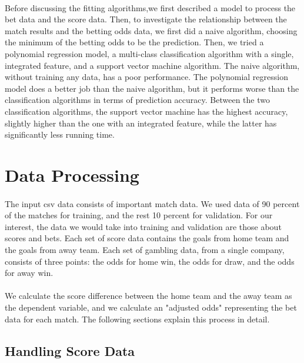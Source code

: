 \documentclass[12pt]{article}
\begin{document}
\paragraph{}
Before discussing the fitting algorithms,we first described a model to process the bet data and the score data. Then, to investigate the relationship between the match results and the betting odds data, we first did a naive algorithm, choosing the minimum of the betting odds to be the prediction. Then, we tried a polynomial regression model, a multi-class classification algorithm with a single, integrated feature, and a support vector machine algorithm. The naive algorithm, without training any data, has a poor performance. The polynomial regression model does a better job than the naive algorithm, but it performs worse than the classification algorithms in terms of prediction accuracy. Between the two classification algorithms, the support vector machine has the highest accuracy, slightly higher than the one with an integrated feature, while the latter has significantly less running time.

\section{Data Processing}
\paragraph{}
The input csv data consists of important match data. We used data of 90 percent of the matches for training, and the rest 10 percent for validation. For our interest, the data we would take into training and validation are those about scores and bets. Each set of score data contains the goals from home team and the goals from away team. Each set of gambling data, from a single company, consists of three points: the odds for home win, the odds for draw, and the odds for away win.
\paragraph{}
 We calculate the score difference between the home team and the away team as the dependent variable, and we calculate an "adjusted odds" representing the bet data for each match. The following sections explain this process in detail.

\subsection{Handling Score Data}
\end{document}
